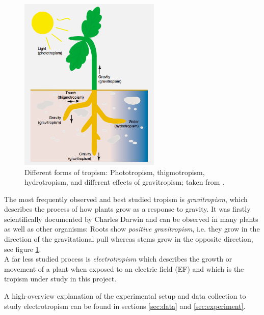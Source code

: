 \begin{figure}[H]
	\centering
	\includegraphics[width=0.6\textwidth]{../Figures/tropism.png}
	\caption{Different forms of tropism: Phototropism, thigmotropism, hydrotropism, and different effects of gravitropism; taken from \cite{gilroy2008plant}.}
	\label{fig:tropism}
\end{figure}

The most frequently observed and best studied tropism is \textit{gravitropism}, which describes the process of how plants grow as a response to gravity. It was firstly scientifically documented by Charles Darwin \cite{nick2017} and can be observed in many plants as well as other organisms: Roots show \textit{positive gravitropism}, i.e. they grow in the direction of the gravitational pull whereas stems grow in the opposite direction, see figure \ref{fig:tropism}. 
\\
A far less studied process is \textit{electrotropism} which describes the growth or movement of a plant when exposed to an electric field (EF) and which is the tropism under study in this project. 

A high-overview explanation of the experimental setup and data collection to study electrotropism can be found in sections \ref{sec:data} and \ref{sec:experiment}.

